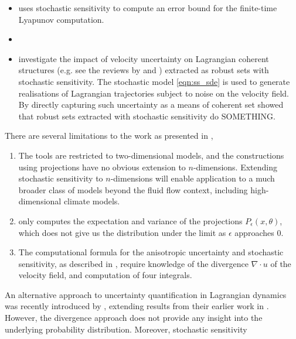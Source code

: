 \begin{itemize}
	\item \citet{Balasuriya_2020_UncertaintyFinitetimeLyapunov} uses stochastic sensitivity to compute an error bound for the finite-time Lyapunov computation.


	\item \citet{FangEtAl_2020_DisentanglingResolutionPrecision}


	\item \citet{BadzaEtAl_2023_HowSensitiveAre} investigate the impact of velocity uncertainty on Lagrangian coherent structures (e.g. see the reviews by \citet{BalasuriyaEtAl_2018_GeneralizedLagrangianCoherent} and \citet{HadjighasemEtAl_2017_CriticalComparisonLagrangian}) extracted as robust sets with stochastic sensitivity.
	      The stochastic model \eqref{eqn:ss_sde} is used to generate realisations of Lagrangian trajectories subject to noise on the velocity field.
	      By directly capturing such uncertainty as a means of coherent set \citet{BadzaEtAl_2023_HowSensitiveAre} showed that robust sets extracted with stochastic sensitivity do SOMETHING.

\end{itemize}
There are several limitations to the work as presented in \cite{Balasuriya_2020_StochasticSensitivityComputable},
\begin{enumerate}
	\item The tools are restricted to two-dimensional models, and the constructions using projections have no obvious extension to \(n\)-dimensions.
	      Extending stochastic sensitivity to \(n\)-dimensions will enable application to a much broader class of models beyond the fluid flow context, including high-dimensional climate models.

	\item \citet{Balasuriya_2020_StochasticSensitivityComputable} only computes the expectation and variance of the projections \(P_\epsilon(x,\theta)\), which does not give us the distribution under the limit as \(\epsilon\) approaches 0.

	\item The computational formula for the anisotropic uncertainty and stochastic sensitivity, as described in , require knowledge of the divergence \(\nabla\cdot u\) of the velocity field, and computation of four integrals.
\end{enumerate}

An alternative approach to uncertainty quantification in Lagrangian dynamics was recently introduced by \citet{BranickiUda_2023_PathBasedDivergenceRates}, extending results from their earlier work in \cite{BranickiUda_2021_LagrangianUncertaintyQuantification}.
However, the divergence approach does not provide any insight into the underlying probability distribution.
Moreover, stochastic sensitivity


